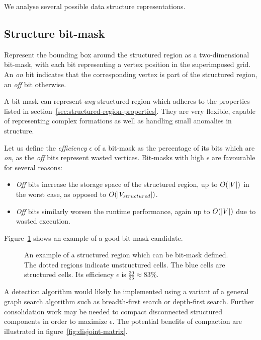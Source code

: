We analyse several possible data structure representations.

\subsection{Structure bit-mask}
\label{subsec:structure-bitmap}

\newcommand{\drawbitmap}[2]{
	
}

Represent the bounding box around the structured region as a two-dimensional bit-mask, with each bit representing a vertex position in the superimposed grid. An \emph{on} bit indicates that the corresponding vertex is part of the structured region, an \emph{off} bit otherwise.

A bit-mask can represent \emph{any} structured region which adheres to the properties listed in section~\ref{sec:structured-region-properties}. They are very flexible, capable of representing complex formations as well as handling small anomalies in structure.

Let us define the \emph{efficiency} $\epsilon$ of a bit-mask as the percentage of its bits which are \emph{on}, as the \emph{off} bits represent wasted vertices. Bit-masks with high $\epsilon$ are favourable for several reasons:
\begin{itemize}
\item \emph{Off} bits increase the storage space of the structured region, up to $O(\left\vert{V}\right\vert)$ in the worst case, as opposed to $O(\left\vert{V_{structured}}\right\vert)$.
\item \emph{Off} bits similarly worsen the runtime performance, again up to $O(\left\vert{V}\right\vert)$ due to wasted execution.
\end{itemize}

Figure~\ref{fig:example-bitmask} shows an example of a good bit-mask candidate.

\begin{figure}
\drawmatrix[cell wd=0.8, cell ht=0.8]{\bitmapmatrix}
\caption{An example of a structured region which can be bit-mask defined. The dotted regions indicate unstructured cells. The blue cells are structured cells. Its efficiency $\epsilon$ is $\frac{30}{36} \approx 83\%$.}
\label{fig:example-bitmask}
\end{figure}

A detection algorithm would likely be implemented using a variant of a general graph search algorithm such as breadth-first search or depth-first search. Further consolidation work may be needed to compact disconnected structured components in order to maximize $\epsilon$. The potential benefits of compaction are illustrated in figure~\ref{fig:disjoint-matrix}.


